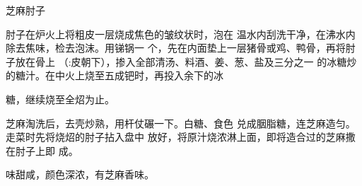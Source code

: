 \begin{recipe}{芝麻肘子}

\ingredients



\cooking

\step 肘子在炉火上将粗皮一层烧成焦色的皱纹状时，泡在 温水内刮洗干净，在沸水内除去焦味，检去泡沫。用锑锅一 个，先在内面垫上一层猪骨或鸡、鸭骨，再将肘子放在骨上 （:皮朝下），掺入全部清汤、料酒、姜、葱、盐及三分之一 的冰糖炒的糖汁。在中火上烧至五成钯时，再投入余下的冰

糖，继续烧至全炤为止。

\step 芝麻淘洗后，去壳炒熟，用杆仗碾一下。白糖、食色 兑成胭脂糖，连芝麻造匀。走菜时先将烧炤的肘子拈入盘中 放好，将原汁烧浓淋上面，即将造合过的芝麻撒在肘子上即 成。

\notes

味甜咸，颜色深浓，有芝麻香味。

\end{recipe}

